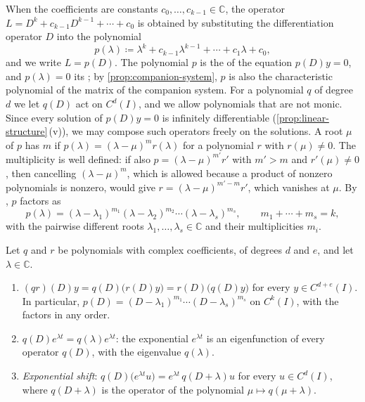 When the coefficients are constants $c_0,\ldots,c_{k-1}\in\mathbb C$, the operator $L=D^k+c_{k-1}D^{k-1}+\cdots+c_0$ is obtained by substituting the differentiation operator $D$ into the polynomial
\[
p(\lambda)\coloneqq\lambda^k+c_{k-1}\lambda^{k-1}+\cdots+c_1\lambda+c_0 ,
\]
and we write $L=p(D)$. The polynomial $p$ is the  of the equation $p(D)y=0$, and $p(\lambda)=0$ its ; by \cref{prop:companion-system}, $p$ is also the characteristic polynomial of the matrix of the companion system. For a polynomial $q$ of degree $d$ we let $q(D)$ act on $C^d(I)$, and we allow polynomials that are not monic. Since every solution of $p(D)y=0$ is infinitely differentiable (\cref{prop:linear-structure}\,(v)), we may compose such operators freely on the solutions. A root $\mu$ of $p$ has  $m$ if $p(\lambda)=(\lambda-\mu)^mr(\lambda)$ for a polynomial $r$ with $r(\mu)\ne0$. The multiplicity is well defined: if also $p=(\lambda-\mu)^{m'}r'$ with $m'>m$ and $r'(\mu)\ne0$, then cancelling $(\lambda-\mu)^m$, which is allowed because a product of nonzero polynomials is nonzero, would give $r=(\lambda-\mu)^{m'-m}r'$, which vanishes at $\mu$. By , $p$ factors as
\begin{equation}
p(\lambda)=(\lambda-\lambda_1)^{m_1}(\lambda-\lambda_2)^{m_2}\cdots(\lambda-\lambda_s)^{m_s},\qquad m_1+\cdots+m_s=k,
\label{eq:char-factorisation}
\end{equation}
with the pairwise different roots $\lambda_1,\ldots,\lambda_s\in\mathbb C$ and their multiplicities $m_i$.

\begin{lemma}[Polynomials in $D$]
\label{lem:polynomials-in-d}
Let $q$ and $r$ be polynomials with complex coefficients, of degrees $d$ and $e$, and let $\lambda\in\mathbb C$.
\begin{enumerate}
\item $(qr)(D)y=q(D)\bigl(r(D)y\bigr)=r(D)\bigl(q(D)y\bigr)$ for every $y\in C^{d+e}(I)$. In particular, $p(D)=(D-\lambda_1)^{m_1}\cdots(D-\lambda_s)^{m_s}$ on $C^k(I)$, with the factors in any order.
\item $q(D)e^{\lambda t}=q(\lambda)e^{\lambda t}$: the exponential $e^{\lambda t}$ is an eigenfunction of every operator $q(D)$, with the eigenvalue $q(\lambda)$.
\item \emph{Exponential shift}: $q(D)\bigl(e^{\lambda t}u\bigr)=e^{\lambda t}\,q(D+\lambda)u$ for every $u\in C^d(I)$, where $q(D+\lambda)$ is the operator of the polynomial $\mu\mapsto q(\mu+\lambda)$.
\end{enumerate}
\end{lemma}

